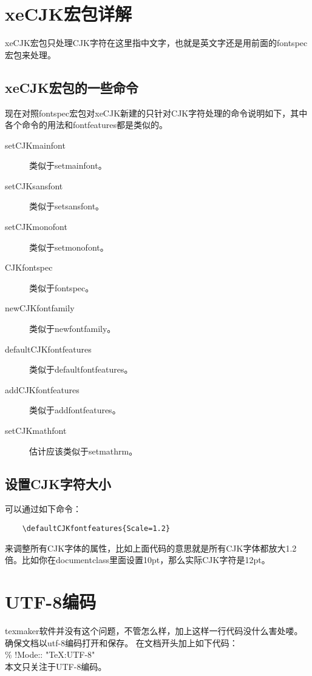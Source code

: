 \documentclass[11pt,oneside]{book}
\begin{document}
  \section{xeCJK宏包详解}
  xeCJK宏包只处理CJK字符在这里指中文字，也就是英文字还是用前面的fontspec宏包来处理。

  \subsection{xeCJK宏包的一些命令}
  现在对照fontspec宏包对xeCJK新建的只针对CJK字符处理的命令说明如下，其中各个命令的用法和fontfeatures都是类似的。
  \begin{description}
  \item[setCJKmainfont] 类似于setmainfont。
  \item[setCJKsansfont] 类似于setsansfont。
  \item[setCJKmonofont] 类似于setmonofont。
  \item[CJKfontspec] 类似于fontspec。
  \item[newCJKfontfamily] 类似于newfontfamily。
  \item[defaultCJKfontfeatures] 类似于defaultfontfeatures。
  \item[addCJKfontfeatures] 类似于addfontfeatures。
  \item[setCJKmathfont] 估计应该类似于setmathrm。
  \end{description}

  \subsection{设置CJK字符大小}
  可以通过如下命令：
  \begin{Verbatim}
    \defaultCJKfontfeatures{Scale=1.2}
  \end{Verbatim}
  来调整所有CJK字体的属性，比如上面代码的意思就是所有CJK字体都放大1.2倍。比如你在documentclass里面设置10pt，那么实际CJK字符是12pt。


  \section{UTF-8编码}
  texmaker软件并没有这个问题，不管怎么样，加上这样一行代码没什么害处喽。确保文档以utf-8编码打开和保存。
  在文档开头加上如下代码：\\
  \% !Mode:: "TeX:UTF-8" \\
  本文只关注于UTF-8编码。
\end{document}
